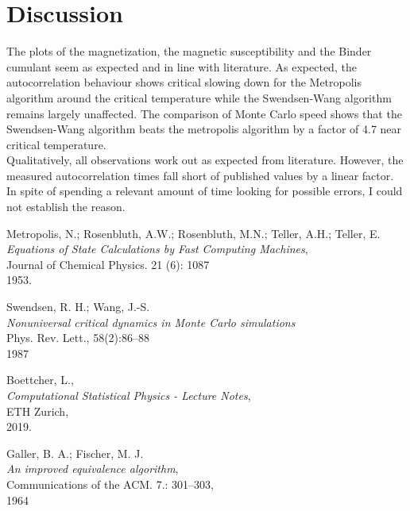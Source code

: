 \documentclass[11pt,a4paper]{article}
\begin{document}
\section{Discussion}
The plots of the magnetization, the magnetic susceptibility and the Binder cumulant 
seem as expected and in line with literature.
As expected, the autocorrelation behaviour shows critical slowing down for the Metropolis
algorithm around the critical temperature while the Swendsen-Wang algorithm remains largely unaffected.
The comparison of Monte Carlo speed shows that the Swendsen-Wang algorithm beats the metropolis
algorithm by a factor of 4.7 near critical temperature.\\
Qualitatively, all observations work out as expected from literature. However, the measured autocorrelation times
fall short of published values by a linear factor. In spite of spending a relevant amount of time looking for possible errors,
 I could not establish the reason.



\pagebreak
\begin{thebibliography}{99}



	Metropolis, N.;
	Rosenbluth, A.W.;
	Rosenbluth, M.N.;
	Teller, A.H.;
	Teller, E.\\
	\emph{Equations of State Calculations by Fast Computing Machines},\\
	Journal of Chemical Physics. 21 (6): 1087\\
	1953.

	Swendsen, R. H.; Wang, J.-S.\\
	\emph{Nonuniversal critical dynamics in Monte Carlo simulations}\\
	Phys. Rev. Lett., 58(2):86–88\\
	1987

	Boettcher, L.,\\
	\emph{Computational Statistical Physics - Lecture Notes},\\
	ETH Zurich,\\
	2019.

	Galler, B. A.; Fischer, M. J.\\
	\emph{An improved equivalence algorithm},\\
	Communications of the ACM. 7.: 301–303,\\
	1964

\end{thebibliography}
\end{document}
